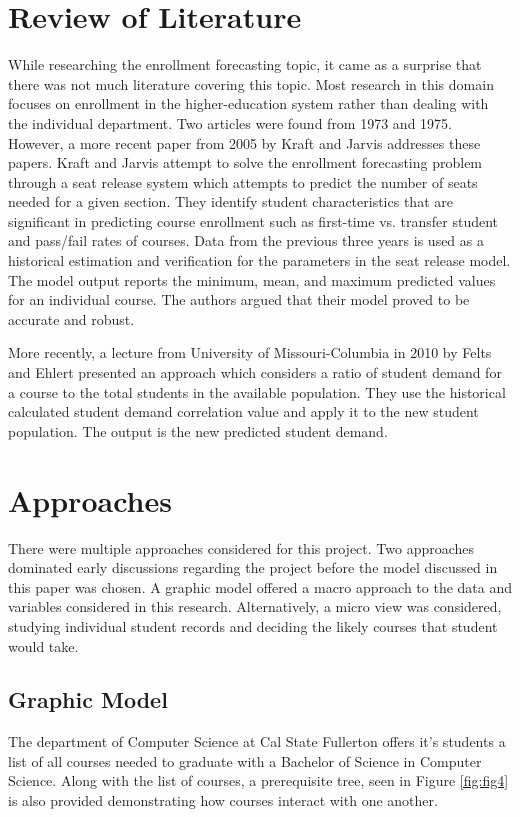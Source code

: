 \documentclass[12pt]{article}
\begin{document}
\section*{Review of Literature}
While researching the enrollment forecasting topic, it came as a surprise that there was not much literature 
covering this topic. Most research in this domain focuses on enrollment in the higher-education system 
rather than dealing with the individual department. Two articles were found from 1973 and 1975. However, 
a more recent paper from 2005 by Kraft and Jarvis \cite{kraft2005adaptive} addresses these papers. 
Kraft and Jarvis attempt to solve the enrollment forecasting problem through a seat release system which 
attempts to predict the number of seats needed for a given section. They identify student characteristics 
that are significant in predicting course enrollment such as first-time vs. transfer student and pass/fail rates 
of courses. Data from the previous three years is used as a historical estimation and verification for the 
parameters in the seat release model. The model output reports the minimum, mean, and maximum 
predicted values for an individual course. The authors argued that their model proved to be accurate and 
robust.

More recently, a lecture from University of Missouri-Columbia in 2010 by Felts and Ehlert \cite{LectureMU} 
presented an approach which considers a ratio of student demand for a course to the total students in the 
available population. They use the historical calculated student demand correlation value and apply it to the 
new student population. The output is the new predicted student demand. 


\section*{Approaches}
There were multiple approaches considered for this project. Two approaches dominated early discussions
regarding the project before the model discussed in this paper was chosen. A graphic model offered a 
macro approach to the data and variables considered in this research. Alternatively, a micro view was 
considered, studying individual student records and deciding the likely courses that student would take.

\subsection*{Graphic Model}
The department of Computer Science
at Cal State Fullerton offers it's students a list of all courses needed to graduate with a Bachelor of 
Science in Computer Science. Along with the list of courses, a prerequisite tree, seen in Figure \ref{fig:fig4} 
 is also provided demonstrating how courses interact with one another. 
\end{document}
